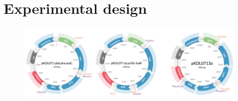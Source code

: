 \section{Experimental design}



\begin{figure}[t]
	\begin{center}
		\includegraphics[scale=0.7]{../../chapters/chapterDesignSwitches/images/final-plasmids.png}
		\caption[LoF caption]{\label{fig:finalpl}}
	\end{center}
\end{figure}
